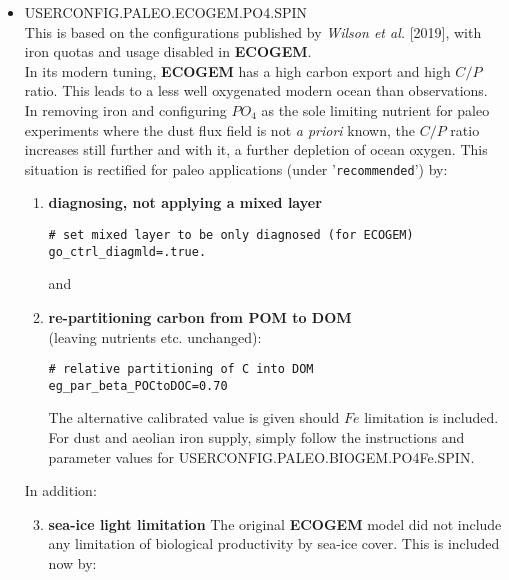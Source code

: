 \documentclass[11pt,fleqn]{book} %
\begin{document}
\begin{itemize}[noitemsep]
\vspace{2mm}
\item \textsf{\small USERCONFIG.PALEO.ECOGEM.PO4.SPIN}
\vspace{1mm}
\\This is based on the configurations published by \textit{Wilson et al.} [2019], with iron quotas and usage disabled in \textbf{ECOGEM}.
\\In its modern tuning, \textbf{ECOGEM} has a high carbon export and high \(C/P\) ratio. This leads to a less well oxygenated modern ocean than observations. In removing iron and configuring \(PO_{4}\) as the sole limiting nutrient for paleo experiments where the dust flux field is not \textit{a priori} known, the \(C/P\) ratio increases still further and with it, a further depletion of ocean oxygen. This situation is rectified for paleo applications (under '\texttt{recommended}') by:
\begin{enumerate}[noitemsep]
\vspace{1mm}
\item \textbf{diagnosing, not applying a mixed layer}
\small\vspace{-1mm}\begin{verbatim}
# set mixed layer to be only diagnosed (for ECOGEM)
go_ctrl_diagmld=.true.
\end{verbatim}\vspace{-1mm}\normalsize
and
\vspace{1mm}
\item \textbf{re-partitioning carbon from POM to DOM}
\\(leaving nutrients etc. unchanged):
\small\vspace{-1mm}\begin{verbatim}
# relative partitioning of C into DOM
eg_par_beta_POCtoDOC=0.70
\end{verbatim}\vspace{-1mm}\normalsize
The alternative calibrated value is given should \(Fe\) limitation is included. For dust and aeolian iron supply, simply follow the instructions and parameter values for \linebreak \textsf{\footnotesize USERCONFIG.PALEO.BIOGEM.PO4Fe.SPIN}.
\end{enumerate}
In addition:
\begin{enumerate}[noitemsep]
\setcounter{enumi}{2}
\vspace{1mm}
\item \textbf{sea-ice light limitation}
The original \textbf{ECOGEM} model did not include any limitation of biological productivity by sea-ice cover. This is included now by:

\end{enumerate}
\end{itemize}
\end{document}
